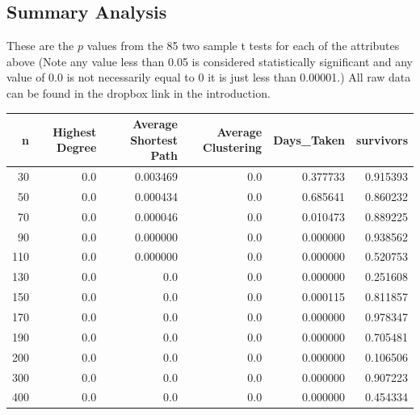 \documentclass{article}
\begin{document}
            \subsection{Summary Analysis}
            These are the $p$ values from the 85 two sample t tests for each of the attributes above (Note any value less than 0.05 is considered statistically significant and any value of 0.0 is not necessarily equal to 0 it is just less than 0.00001.) All raw data can be found in the dropbox link in the introduction.
            \begin{tabular}{rrrrrr}
                \toprule
                  n &  Highest Degree &  Average Shortest Path &  Average Clustering &  Days\_Taken &  survivors \\
                \midrule
                 30 &             0.0 &               0.003469 &                 0.0 &    0.377733 &   0.915393 \\
                 50 &             0.0 &               0.000434 &                 0.0 &    0.685641 &   0.860232 \\
                 70 &             0.0 &               0.000046 &                 0.0 &    0.010473 &   0.889225 \\
                 90 &             0.0 &               0.000000 &                 0.0 &    0.000000 &   0.938562 \\
                110 &             0.0 &               0.000000 &                 0.0 &    0.000000 &   0.520753 \\
                130 &             0.0 &                    0.0 &                 0.0 &    0.000000 &   0.251608 \\
                150 &             0.0 &                    0.0 &                 0.0 &    0.000115 &   0.811857 \\
                170 &             0.0 &                    0.0 &                 0.0 &    0.000000 &   0.978347 \\
                190 &             0.0 &                    0.0 &                 0.0 &    0.000000 &   0.705481 \\
                200 &             0.0 &                    0.0 &                 0.0 &    0.000000 &   0.106506 \\
                300 &             0.0 &                    0.0 &                 0.0 &    0.000000 &   0.907223 \\
                400 &             0.0 &                    0.0 &                 0.0 &    0.000000 &   0.454334 \\

\end{tabular}
\end{document}
